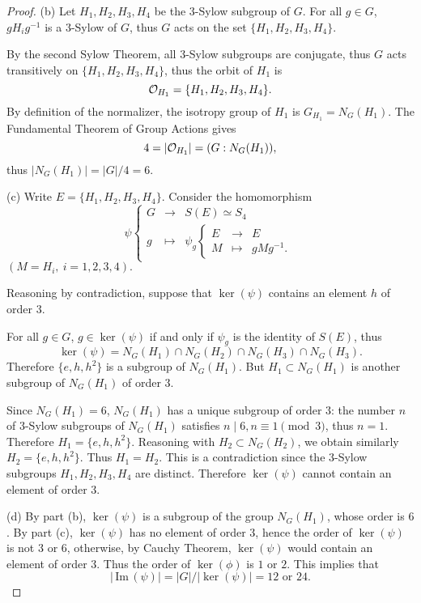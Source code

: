 \documentclass[11pt,a4paper]{article}
\newcommand{\im}{\,\mathrm{Im}\,}
\begin{document}
{\begin{proof}
\item[(b)] Let $H_1,H_2,H_3,H_4$ be the $3$-Sylow subgroup of $G$. For all $g \in G$, $gH_ig^{-1}$ is a $3$-Sylow of $G$, thus $G$ acts on the set $\{H_1,H_2,H_3,H_4\}$.

By the second Sylow Theorem, all $3$-Sylow subgroups are conjugate, thus $G$ acts transitively on $\{H_1,H_2,H_3,H_4\}$, thus the orbit of $H_1$ is 
$${\cal O}_{H_1} = \{H_1,H_2,H_3,H_4\}.$$
By definition of the normalizer, the isotropy group of $H_1$ is $G_{H_1} = N_G(H_1)$. The Fundamental Theorem of Group Actions gives
$$4 = |{\cal O}_{H_1} | = (G : N_G(H_1)),$$
thus $|N_G(H_1)| = |G|/4 = 6$.

\item[(c)] Write $E = \{H_1,H_2,H_3,H_4\}$. Consider the homomorphism
$$
\psi
\left\{
\begin{array}{ccc}
G & \to & S(E) \simeq S_4\\
g & \mapsto &\psi_g
   \left\{
    \begin{array}{ccc}
 E & \to &E\\
   M& \mapsto & gMg^{-1}.
   \end{array}
   \right.
\end{array}
\right.
$$
$(M = H_i,\ i=1,2,3,4).$

Reasoning by contradiction, suppose that $\ker(\psi)$ contains an element $h$ of order $3$.

 For all $g\in G$, $g \in \ker(\psi)$ if and only if $\psi_g$ is the identity of $S(E)$, thus $$\ker(\psi) =  N_G(H_1) \cap N_G(H_2)\cap N_G(H_3) \cap N_G(H_3).$$
 Therefore  $\{e,h,h^2\}$ is a subgroup of $N_G(H_1)$. But $H_1 \subset N_G(H_1)$ is another subgroup of $N_G(H_1)$ of order $3$.
 
 Since $N_G(H_1) = 6$, $N_G(H_1)$ has a unique subgroup of order $3$: the number $n$ of $3$-Sylow subgroups of $N_G(H_1)$ satisfies $n \mid 6, n \equiv 1 \pmod 3$, thus $n=1$. Therefore $H_1 = \{e,h,h^2\}$. Reasoning with $H_2\subset N_G(H_2)$, we obtain similarly $H_2 = \{e,h,h^2\}$. Thus $H_1 = H_2$. This is a contradiction since the $3$-Sylow subgroups $H_1,H_2,H_3,H_4$ are distinct. Therefore $\ker(\psi)$ cannot contain an element of order $3$.
 
 \item[(d)] By part (b), $\ker(\psi)$ is a subgroup of the group $N_G(H_1)$, whose  order is $6$. By part (c), $\ker(\psi)$ has no element of order 3, hence the order of $\ker(\psi)$ is not $3$ or $6$, otherwise, by Cauchy Theorem, $\ker(\psi)$ would contain an element of order $3$. Thus the order of $\ker(\phi)$ is $1$ or $2$. This implies that
 $$|\im(\psi)| = |G|/|\ker(\psi)| = 12 \text{ or } 24.$$
 

\end{proof}}
\end{document}
